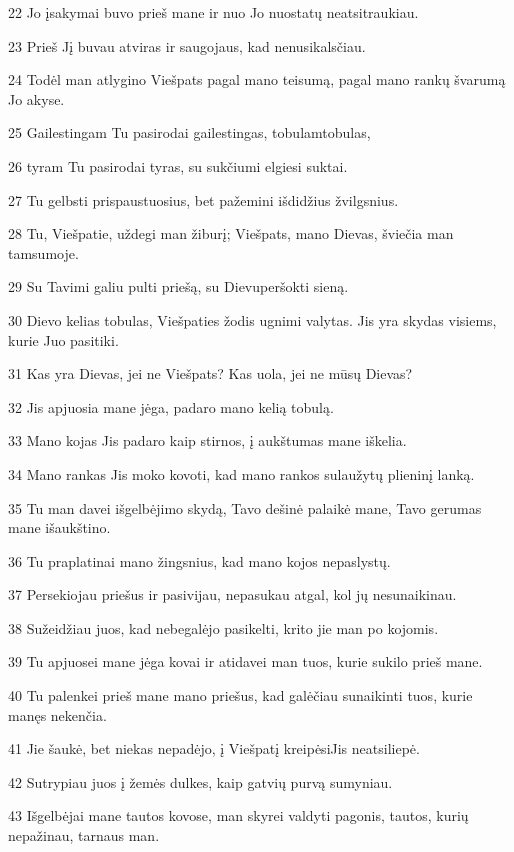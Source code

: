 \par 22 Jo įsakymai buvo prieš mane ir nuo Jo nuostatų neatsitraukiau. 
\par 23 Prieš Jį buvau atviras ir saugojaus, kad nenusikalsčiau. 
\par 24 Todėl man atlygino Viešpats pagal mano teisumą, pagal mano rankų švarumą Jo akyse. 
\par 25 Gailestingam Tu pasirodai gailestingas, tobulam­tobulas, 
\par 26 tyram Tu pasirodai tyras, su sukčiumi elgiesi suktai. 
\par 27 Tu gelbsti prispaustuosius, bet pažemini išdidžius žvilgsnius. 
\par 28 Tu, Viešpatie, uždegi man žiburį; Viešpats, mano Dievas, šviečia man tamsumoje. 
\par 29 Su Tavimi galiu pulti priešą, su Dievu­peršokti sieną. 
\par 30 Dievo kelias tobulas, Viešpaties žodis ugnimi valytas. Jis yra skydas visiems, kurie Juo pasitiki. 
\par 31 Kas yra Dievas, jei ne Viešpats? Kas uola, jei ne mūsų Dievas? 
\par 32 Jis apjuosia mane jėga, padaro mano kelią tobulą. 
\par 33 Mano kojas Jis padaro kaip stirnos, į aukštumas mane iškelia. 
\par 34 Mano rankas Jis moko kovoti, kad mano rankos sulaužytų plieninį lanką. 
\par 35 Tu man davei išgelbėjimo skydą, Tavo dešinė palaikė mane, Tavo gerumas mane išaukštino. 
\par 36 Tu praplatinai mano žingsnius, kad mano kojos nepaslystų. 
\par 37 Persekiojau priešus ir pasivijau, nepasukau atgal, kol jų nesunaikinau. 
\par 38 Sužeidžiau juos, kad nebegalėjo pasikelti, krito jie man po kojomis. 
\par 39 Tu apjuosei mane jėga kovai ir atidavei man tuos, kurie sukilo prieš mane. 
\par 40 Tu palenkei prieš mane mano priešus, kad galėčiau sunaikinti tuos, kurie manęs nekenčia. 
\par 41 Jie šaukė, bet niekas nepadėjo, į Viešpatį kreipėsi­Jis neatsiliepė. 
\par 42 Sutrypiau juos į žemės dulkes, kaip gatvių purvą sumyniau. 
\par 43 Išgelbėjai mane tautos kovose, man skyrei valdyti pagonis, tautos, kurių nepažinau, tarnaus man. 
